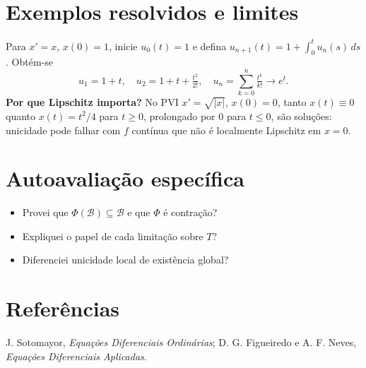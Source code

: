 \documentclass[11pt,a4paper]{article}
\begin{document}
\section{Exemplos resolvidos e limites}
Para $x'=x$, $x(0)=1$, inicie $u_0(t)=1$ e defina $u_{n+1}(t)=1+\int_0^t u_n(s)\,ds$. Obtém-se
\[
u_1=1+t,\quad u_2=1+t+\tfrac{t^2}{2!},\quad
u_n=\sum_{k=0}^{n}\tfrac{t^k}{k!}\longrightarrow e^t.
\]
\textbf{Por que Lipschitz importa?} No PVI $x'=\sqrt{|x|}$, $x(0)=0$, tanto $x(t)\equiv0$ quanto $x(t)=t^2/4$ para $t\ge0$, prolongado por $0$ para $t\le0$, são soluções: unicidade pode falhar com $f$ contínua que não é localmente Lipschitz em $x=0$.
\section{Autoavaliação específica}
\begin{itemize}
\item Provei que $\Phi(\mathcal B)\subseteq\mathcal B$ e que $\Phi$ é contração?
\item Expliquei o papel de cada limitação sobre $T$?
\item Diferenciei unicidade local de existência global?
\end{itemize}
\RubricaUFMT
\section{Referências}
J. Sotomayor, \emph{Equações Diferenciais Ordinárias}; D. G. Figueiredo e A. F. Neves, \emph{Equações Diferenciais Aplicadas}.
\end{document}
